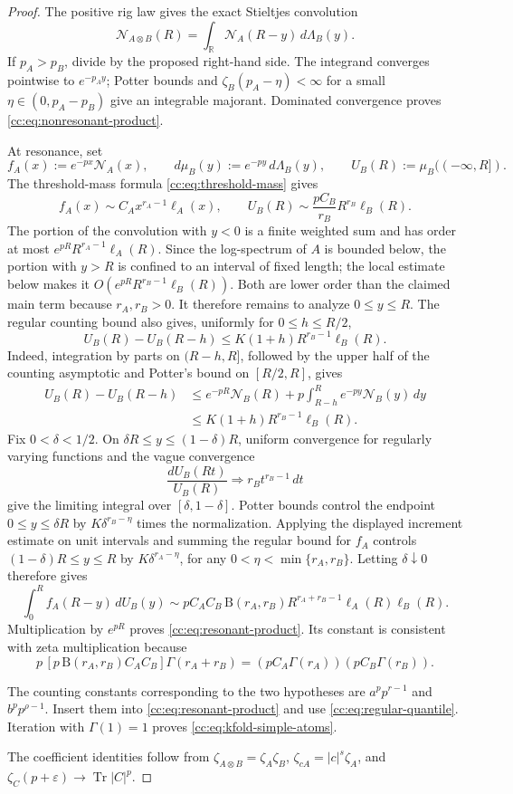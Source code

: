 \documentclass[10pt,reqno]{amsart}
\theoremstyle{plain}
\theoremstyle{definition}
\theoremstyle{remark}
\begin{document}
\begin{proof}
The positive rig law gives the exact Stieltjes convolution
\[
 \mathcal N_{A\otimes B}(R)
 =\int_{\mathbb R}\mathcal N_A(R-y)\,d\Lambda_B(y).
\]
If \(p_A>p_B\), divide by the proposed right-hand side.
The integrand converges pointwise to \(e^{-p_Ay}\); Potter bounds and
\(\zeta_B(p_A-\eta)<\infty\) for a small
\(\eta\in(0,p_A-p_B)\) give an integrable majorant.  Dominated convergence
proves \eqref{cc:eq:nonresonant-product}.

At resonance, set
\[
 f_A(x):=e^{-px}\mathcal N_A(x),\qquad
 d\mu_B(y):=e^{-py}\,d\Lambda_B(y),\qquad
 U_B(R):=\mu_B(({-}\infty,R]).
\]
The threshold-mass formula \eqref{cc:eq:threshold-mass} gives
\[
 f_A(x)\sim C_Ax^{r_A-1}\ell_A(x),\qquad
 U_B(R)\sim\frac{pC_B}{r_B}R^{r_B}\ell_B(R).
\]
The portion of the convolution with \(y<0\) is a finite weighted sum and
has order at most
\(e^{pR}R^{r_A-1}\ell_A(R)\).  Since the log-spectrum of \(A\) is bounded
below, the portion with \(y>R\) is confined to an interval of fixed length;
the local estimate below makes it
\(O(e^{pR}R^{r_B-1}\ell_B(R))\).  Both are lower order than the claimed
main term because \(r_A,r_B>0\).  It therefore remains to analyze
\(0\leq y\leq R\).
The regular counting bound also gives, uniformly for
\(0\leq h\leq R/2\),
\[
 U_B(R)-U_B(R-h)
 \leq K(1+h)R^{r_B-1}\ell_B(R).
\]
Indeed, integration by parts on \((R-h,R]\), followed by the upper half of
the counting asymptotic and Potter's bound on \([R/2,R]\), gives
\begin{align*}
 U_B(R)-U_B(R-h)
 &\leq e^{-pR}\mathcal N_B(R)
   +p\int_{R-h}^R e^{-py}\mathcal N_B(y)\,dy\\
 &\leq K(1+h)R^{r_B-1}\ell_B(R).
\end{align*}
Fix \(0<\delta<1/2\).  On
\(\delta R\leq y\leq(1-\delta)R\), uniform convergence for regularly
varying functions and the vague convergence
\[
 \frac{dU_B(Rt)}{U_B(R)}
 \Longrightarrow r_Bt^{r_B-1}\,dt
\]
give the limiting integral over \([\delta,1-\delta]\).  Potter bounds
control the endpoint \(0\leq y\leq\delta R\) by
\(K\delta^{r_B-\eta}\) times the normalization.  Applying the displayed
increment estimate on unit intervals and summing the regular bound for
\(f_A\) controls \((1-\delta)R\leq y\leq R\) by
\(K\delta^{r_A-\eta}\), for any
\(0<\eta<\min\{r_A,r_B\}\).  Letting \(\delta\downarrow0\) therefore gives
\[
 \int_0^R f_A(R-y)\,dU_B(y)
 \sim pC_AC_B\,\mathrm B(r_A,r_B)
 R^{r_A+r_B-1}\ell_A(R)\ell_B(R).
\]
Multiplication by \(e^{pR}\) proves
\eqref{cc:eq:resonant-product}.  Its constant is consistent with zeta
multiplication because
\[
 p\,[p\,\mathrm B(r_A,r_B)C_AC_B]\Gamma(r_A+r_B)
 =(pC_A\Gamma(r_A))(pC_B\Gamma(r_B)).
\]

The counting constants corresponding to the two hypotheses are
\(a^pp^{r-1}\) and \(b^pp^{\rho-1}\).  Insert them into
\eqref{cc:eq:resonant-product} and use
\eqref{cc:eq:regular-quantile}.  Iteration with
\(\Gamma(1)=1\) proves \eqref{cc:eq:kfold-simple-atoms}.

The coefficient identities follow from
\(\zeta_{A\otimes B}=\zeta_A\zeta_B\),
\(\zeta_{cA}=|c|^s\zeta_A\), and
\(\zeta_C(p+\varepsilon)\to\operatorname{Tr}|C|^p\).
\end{proof}
\end{document}
